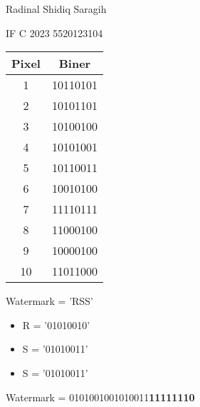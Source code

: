 \documentclass[12pt,a4paper]{article}
\date{}
\begin{document}
Radinal Shidiq Saragih

IF C 2023 5520123104

\vspace{1cm}

\begin{center}
  \begin{adjustbox}{scale=1,center}
    \begin{tabular}{ |c|c| } 
      \hline
      Pixel & Biner     \\ \hline
      1     & 10110101  \\ \hline
      2     & 10101101  \\ \hline
      3     & 10100100  \\ \hline
      4     & 10101001  \\ \hline
      5     & 10110011  \\ \hline
      6     & 10010100  \\ \hline
      7     & 11110111  \\ \hline
      8     & 11000100  \\ \hline
      9     & 10000100  \\ \hline
      10    & 11011000  \\ \hline
    \end{tabular}
  \end{adjustbox}
\end{center}

Watermark = 'RSS'
\begin{itemize}
  \item R = '01010010'
  \item S = '01010011'
  \item S = '01010011'
\end{itemize}

Watermark = 0101001001010011\textbf{11111110}
\end{document}
